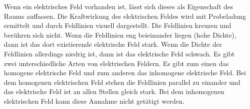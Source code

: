 Wenn ein elektrisches Feld vorhanden ist, lässt sich dieses als Eigenschaft des Raums auffassen.
Die Kraftwirkung des elektrischen Feldes wird mit Probeladung ermittelt und durch Feldlinien visuell dargestellt.
Die Feldlinien kreuzen und berühren sich nicht.
Wenn die Feldlinien eng beieinander liegen (hohe Dichte), dann ist das dort existierende elektrische Feld stark.
Wenn die Dichte der Feldlinien allerdings niedrig ist, dann ist das elektrische Feld schwach.
Es gibt zwei unterschiedliche Arten von elektrischen Feldern. 
Es gibt zum einen das homogene elektrische Feld und zum anderen das inhomogene elektrische Feld.
Bei dem homogenen elektrischen Feld stehen die Feldlinien parallel zu einander und das elektrische Feld ist an allen Stellen gleich stark.
Bei dem inhomogenen elektrischen Feld kann diese Annahme nicht getätigt werden.

